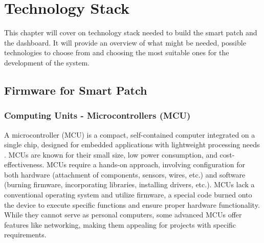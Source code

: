\newpage

\chapter{Technology Stack}
This chapter will cover on technology stack needed to build the smart patch and the dashboard. It will provide an overview of what might be needed, possible technologies to choose from and choosing the most suitable ones for the development of the system.

\section{Firmware for Smart Patch}

\subsection{Computing Units - Microcontrollers (MCU)}
A microcontroller (MCU) is a compact, self-contained computer integrated on a single chip, designed for embedded applications with lightweight processing needs \cite{ref22}. MCUs are known for their small size, low power consumption, and cost-effectiveness. MCUs require a hands-on approach, involving configuration for both hardware (attachment of components, sensors, wires, etc.) and software (burning firmware, incorporating libraries, installing drivers, etc.). MCUs lack a conventional operating system and utilize firmware, a special code burned onto the device to execute specific functions and ensure proper hardware functionality. While they cannot serve as personal computers, some advanced MCUs offer features like networking, making them appealing for projects with specific requirements. \\

